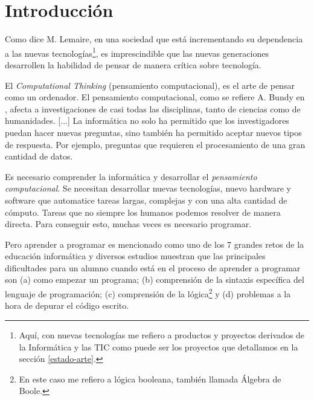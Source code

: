 \chapter{Introducción}
\label{introduccion}



Como dice M. Lemaire\cite{lemaire2014incorporating}, en una sociedad que está incrementando su dependencia a las nuevas tecnologías\footnote{Aquí, con nuevas tecnologías me refiero a productos y proyectos derivados de la Informática y las \acrfull{TIC} como puede ser los proyectos que detallamos en la sección \ref{estado-arte}.}, es imprescindible que las nuevas generaciones desarrollen la habilidad de pensar de manera crítica sobre tecnología.

El \emph{Computational Thinking} (pensamiento computacional)\cite{wing2006computational}, es el arte de pensar como un ordenador. El pensamiento computacional, como se refiere A. Bundy en \cite{bundy2007computational}, afecta a investigaciones de casi todas las disciplinas, tanto de ciencias como de humanidades. [...] La informática no solo ha permitido que los investigadores puedan hacer nuevas preguntas, sino también ha permitido aceptar nuevos tipos de respuesta. Por ejemplo, preguntas que requieren el procesamiento de una gran cantidad de datos.

Es necesario comprender la informática y desarrollar el \emph{pensamiento computacional}. Se necesitan desarrollar nuevas tecnologías, nuevo \gls{hardware} y \gls{software} que automatice tareas largas, complejas y con una alta cantidad de cómputo. Tareas que no siempre los humanos podemos resolver de manera directa. Para conseguir esto, muchas veces es necesario programar.


Pero aprender a programar es mencionado como uno de los 7 grandes retos de la educación informática \cite{mcgettrick2005grand} y diversos estudios \cite{renumol2009classification} muestran que las principales dificultades para un alumno cuando está en el proceso de aprender a programar son (a) como empezar un programa; (b) comprensión de la sintaxis específica del lenguaje de programación; (c) comprensión de la lógica\footnote{En este caso me refiero a lógica booleana, también llamada Álgebra de Boole.} y (d) problemas a la hora de depurar el código escrito.

